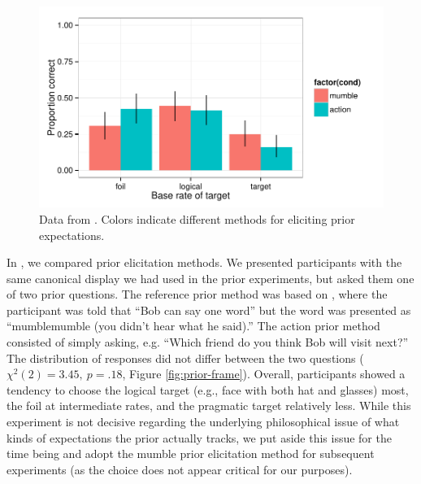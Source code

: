 \begin{figure}[t]
  \centering
  \includegraphics[width=5in]{../plots/2-prior-frame.pdf}
  \caption{\label{fig:prelims-dv} Data from . Colors indicate different methods for eliciting prior expectations.}
\end{figure}

In , we compared prior elicitation methods. We presented participants with the same canonical display we had used in the prior experiments, but asked them one of two prior questions. The reference prior method was based on , where the participant was told that ``Bob can say one word'' but the word was presented as ``mumblemumble (you didn't hear what he said).'' The action prior method consisted of simply asking, e.g. ``Which friend do you think Bob will visit next?'' The distribution of responses did not differ between the two questions ($\chi^2(2) = 3.45,~p = .18$, Figure \ref{fig:prior-frame}). Overall, participants showed a tendency to choose the logical target (e.g., face with both hat and glasses) most, the foil at intermediate rates, and the pragmatic target relatively less. While this experiment is not decisive regarding the underlying philosophical issue of what kinds of expectations the prior actually tracks, we put aside this issue for the time being and adopt the mumble prior elicitation method for subsequent experiments (as the choice does not appear critical for our purposes).


